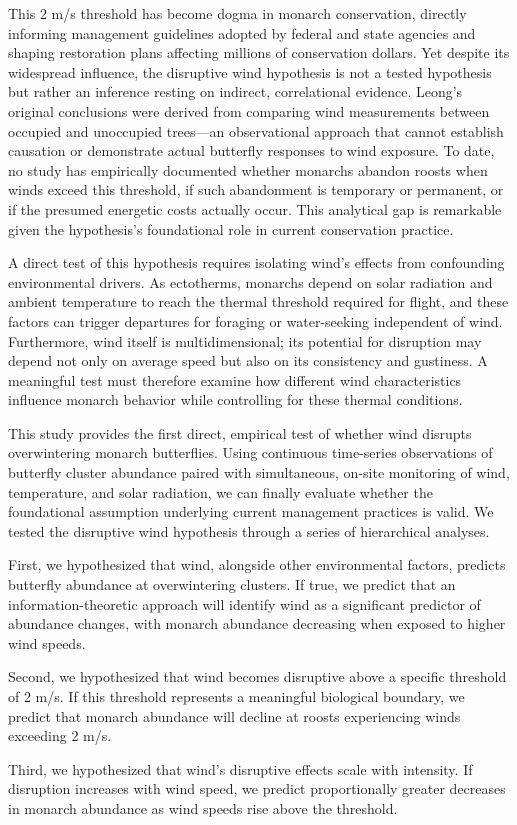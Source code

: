 This 2 m/s threshold has become dogma in monarch conservation, directly informing management guidelines adopted by federal and state agencies and shaping restoration plans affecting millions of conservation dollars. Yet despite its widespread influence, the disruptive wind hypothesis is not a tested hypothesis but rather an inference resting on indirect, correlational evidence. Leong's original conclusions were derived from comparing wind measurements between occupied and unoccupied trees---an observational approach that cannot establish causation or demonstrate actual butterfly responses to wind exposure. To date, no study has empirically documented whether monarchs abandon roosts when winds exceed this threshold, if such abandonment is temporary or permanent, or if the presumed energetic costs actually occur. This analytical gap is remarkable given the hypothesis's foundational role in current conservation practice.

A direct test of this hypothesis requires isolating wind's effects from confounding environmental drivers. As ectotherms, monarchs depend on solar radiation and ambient temperature to reach the thermal threshold required for flight, and these factors can trigger departures for foraging or water-seeking independent of wind. Furthermore, wind itself is multidimensional; its potential for disruption may depend not only on average speed but also on its consistency and gustiness. A meaningful test must therefore examine how different wind characteristics influence monarch behavior while controlling for these thermal conditions.

This study provides the first direct, empirical test of whether wind disrupts overwintering monarch butterflies. Using continuous time-series observations of butterfly cluster abundance paired with simultaneous, on-site monitoring of wind, temperature, and solar radiation, we can finally evaluate whether the foundational assumption underlying current management practices is valid. We tested the disruptive wind hypothesis through a series of hierarchical analyses.

First, we hypothesized that wind, alongside other environmental factors, predicts butterfly abundance at overwintering clusters. If true, we predict that an information-theoretic approach will identify wind as a significant predictor of abundance changes, with monarch abundance decreasing when exposed to higher wind speeds.

Second, we hypothesized that wind becomes disruptive above a specific threshold of 2 m/s. If this threshold represents a meaningful biological boundary, we predict that monarch abundance will decline at roosts experiencing winds exceeding 2 m/s.

Third, we hypothesized that wind's disruptive effects scale with intensity. If disruption increases with wind speed, we predict proportionally greater decreases in monarch abundance as wind speeds rise above the threshold.